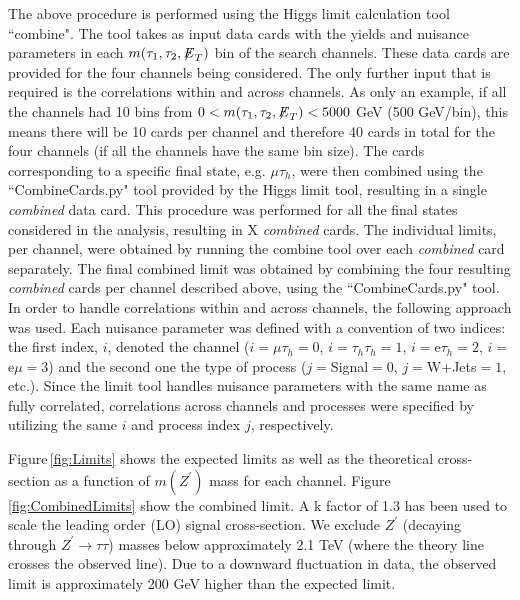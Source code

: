 The above procedure is performed using the Higgs limit calculation tool ``combine". The tool takes as input data cards with the yields and nuisance parameters in 
each $m(\tau_{1},\tau_{2},{\not\mathrel{E}}_T)$ bin of the search channels. These data cards are provided for the four channels being considered. The only further input that 
is required is the correlations within and across channels. As only an example, if all the channels had 10 bins from $0 < m(\tau_{1},\tau_{2},{\not\mathrel{E}}_T) < 5000$ GeV 
(500 GeV/bin), this means there will be 10 cards per channel and therefore 40 cards in total for the four channels (if all the channels have the same bin size).
The cards corresponding to a specific final state, e.g. $\mu\tau_{h}$, were then combined using the ``CombineCards.py" tool provided by the Higgs limit tool, 
resulting in a single \textit{combined} data card. This procedure was performed for all the final states considered in the analysis, resulting in 
X \textit{combined} cards. The individual limits, per channel, were obtained by running the combine tool over each \textit{combined} card separately. The final 
combined limit was obtained by combining the four resulting \textit{combined} cards per channel described above, using the ``CombineCards.py" tool. In order to 
handle correlations within and across channels, the following approach was used. Each nuisance parameter was defined with a convention of two indices: the first 
index, $i$, denoted the channel ($i=\mu\tau_{h}=0$, $i=\tau_{h}\tau_{h}=1$, $i=$e$\tau_{h}=2$, $i=$e$\mu=3$) and the second one the type of process 
($j=$Signal$=0$, $j=$W+Jets$=1$, etc.). Since the limit tool handles nuisance parameters with the same name as fully correlated, correlations across channels and 
processes were specified by utilizing the same $i$ and process index $j$, respectively.

Figure\,\ref{fig:Limits} shows the expected limits as well as the theoretical cross-section as a function of $m(Z^{\prime})$ mass for each channel. 
Figure\,\ref{fig:CombinedLimits} show the combined limit. A k factor of 1.3 has been used to scale the leading order (LO) signal cross-section. 
We exclude $Z^{\prime}$ (decaying through $Z^{\prime}\to\tau\tau$) masses below approximately 2.1 TeV (where the theory line crosses the observed line). Due to a downward fluctuation in data, the observed limit is approximately 200 GeV higher than the expected limit.

